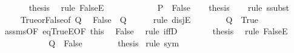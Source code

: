 \begin{isabellebody}
\ \ \ \ \ \ \isamarkupfalse%
\ {\isacharquery}{\kern0pt}thesis\ \isamarkupfalse%
\ {\isacharparenleft}{\kern0pt}rule\ FalseE{\isacharparenright}{\kern0pt}\isanewline
\ \ \ \ \isamarkupfalse%
\isanewline
\ \ \isamarkupfalse%
\isanewline
{}\isamarkupfalse%
\isanewline
\ \ \isamarkupfalse%
\ {}{\isacharcolon}{\kern0pt}\ {\isachardoublequoteopen}P\ {\isacharequal}{\kern0pt}\ False{\isachardoublequoteclose}\isanewline
\ \ \isamarkupfalse%
\ {\isacharquery}{\kern0pt}thesis\isanewline
\ \ \isamarkupfalse%
\ {\isacharparenleft}{\kern0pt}rule\ ssubst{\isacharparenright}{\kern0pt}\isanewline
\ \ \ \ \isamarkupfalse%
\ True{\isacharunderscore}{\kern0pt}or{\isacharunderscore}{\kern0pt}False{\isacharbrackleft}{\kern0pt}of\ Q{\isacharbrackright}{\kern0pt}\ \isamarkupfalse%
\ {\isachardoublequoteopen}False\ {\isacharequal}{\kern0pt}\ Q{\isachardoublequoteclose}\isanewline
\ \ \ \ \isamarkupfalse%
\ {\isacharparenleft}{\kern0pt}rule\ disjE{\isacharparenright}{\kern0pt}\isanewline
\ \ \ \ \ \ \isamarkupfalse%
\ {\isachardoublequoteopen}Q\ {\isacharequal}{\kern0pt}\ True{\isachardoublequoteclose}\isanewline
\ \ \ \ \ \ \isamarkupfalse%
\ {}\ assms{\isacharparenleft}{\kern0pt}{}{\isacharparenright}{\kern0pt}{\isacharbrackleft}{\kern0pt}OF\ eqTrueE{\isacharbrackleft}{\kern0pt}OF\ this{\isacharbrackright}{\kern0pt}{\isacharbrackright}{\kern0pt}\ \isamarkupfalse%
\ False\ \isamarkupfalse%
\ {\isacharparenleft}{\kern0pt}rule\ iffD{}{\isacharparenright}{\kern0pt}\isanewline
\ \ \ \ \ \ \isamarkupfalse%
\ {\isacharquery}{\kern0pt}thesis\ \isamarkupfalse%
\ {\isacharparenleft}{\kern0pt}rule\ FalseE{\isacharparenright}{\kern0pt}\isanewline
\ \ \ \ \isamarkupfalse%
\isanewline
\ \ \ \ \ \ \isamarkupfalse%
\ {\isachardoublequoteopen}Q\ {\isacharequal}{\kern0pt}\ False{\isachardoublequoteclose}\isanewline
\ \ \ \ \ \ \isamarkupfalse%
\ {\isacharquery}{\kern0pt}thesis\ \isamarkupfalse%
{\isacharparenleft}{\kern0pt}rule\ sym{\isacharparenright}{\kern0pt}\isanewline
\ \ \ \ \isamarkupfalse%
\isanewline
\ \ \isamarkupfalse%
\isanewline
{}\isamarkupfalse%
%
\endisatagproof
{\isafoldproof}%
%
\isadelimproof
%
\endisadelimproof
%
\isadelimdocument
%
\endisadelimdocument

\end{isabellebody}

